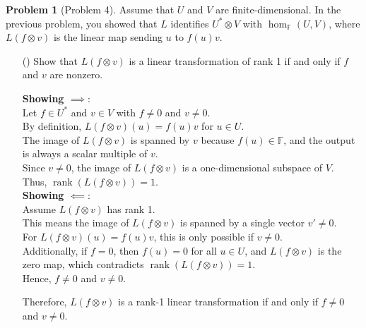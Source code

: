 \documentclass[12pt]{article}
\theoremstyle{definition}
\newtheorem{problem}{Problem}
\newcounter{subq}[problem]
\newenvironment{subproblem}
{\refstepcounter{subq} \begin{itemize} \item[(\alph{subq})]}
{\end{itemize} \medskip}
\begin{document}
\begin{problem}[Problem 4]
    Assume that $U$ and $V$ are finite-dimensional. In the previous problem, you showed that
    $L$ identifies $U^* \otimes V$ with $\hom_{\mathbb{F}}(U, V)$, where $L(f \otimes v)$ is
    the linear map sending $u$ to $f(u)v$.

    \begin{subproblem}
        Show that $L(f \otimes v)$ is a linear transformation of rank 1 if and only if $f$ and $v$ are nonzero.
        
        \begin{solution}
            \textbf{Showing $\implies$}:\\
            Let \( f \in U^* \) and \( v \in V \) with \( f \neq 0 \) and \( v \neq 0 \). \\
            By definition, \( L(f \otimes v)(u) = f(u)v \) for \( u \in U \). \\
            The image of \( L(f \otimes v) \) is spanned by \( v \) because \( f(u) \in \mathbb{F} \), and the output is always a scalar multiple of \( v \).\\
            Since \( v \neq 0 \), the image of \( L(f \otimes v) \) is a one-dimensional subspace of \( V \).\\
            Thus, \( \operatorname{rank}(L(f \otimes v)) = 1 \).\\

            \textbf{Showing $\impliedby$}:\\
            Assume \( L(f \otimes v) \) has rank 1.\\
            This means the image of \( L(f \otimes v) \) is spanned by a single vector \( v' \neq 0 \).\\
            For \( L(f \otimes v)(u) = f(u)v \), this is only possible if \( v \neq 0 \).\\
            Additionally, if \( f = 0 \), then \( f(u) = 0 \) for all \( u \in U \), and \( L(f \otimes v) \) is the zero map, which contradicts \( \operatorname{rank}(L(f \otimes v)) = 1 \).\\
            Hence, \( f \neq 0 \) and \( v \neq 0 \).

            Therefore, \( L(f \otimes v) \) is a rank-1 linear transformation if and only if \( f \neq 0 \) and \( v \neq 0 \).
        
        \end{solution}
    \end{subproblem}


\end{problem}
\end{document}
